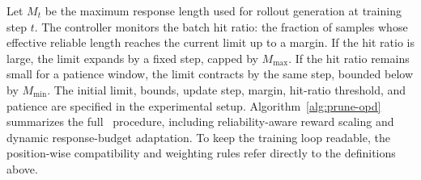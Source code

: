 Let $M_t$ be the maximum response length used for rollout generation at training step $t$.
The controller monitors the batch hit ratio: the fraction of samples whose effective reliable length reaches the current limit up to a margin.
If the hit ratio is large, the limit expands by a fixed step, capped by $M_{\max}$.
If the hit ratio remains small for a patience window, the limit contracts by the same step, bounded below by $M_{\min}$.
The initial limit, bounds, update step, margin, hit-ratio threshold, and patience are specified in the experimental setup. Algorithm~\ref{alg:prune-opd} summarizes the full \method~procedure, including reliability-aware reward scaling and dynamic response-budget adaptation.
To keep the training loop readable, the position-wise compatibility and weighting rules refer directly to the definitions above.

